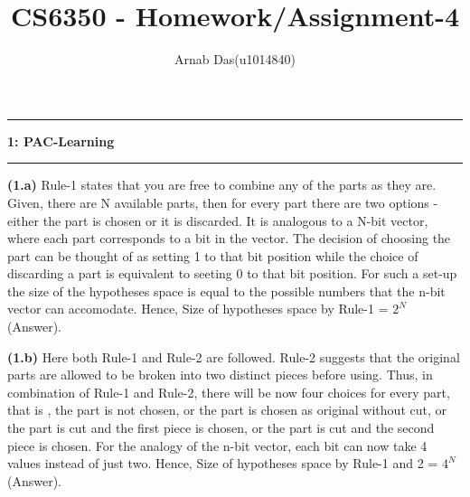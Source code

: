 \documentclass{article}
\title{CS6350 - Homework/Assignment-4}
\author{Arnab Das(u1014840)}
\newcommand\question[2]{\vspace{.25in}\hrule\textbf{#1: #2}\hrule\vspace{.10in}}
\renewcommand\part[1]{\vspace{.10in}\textbf{(#1)}}
\begin{document}
  \maketitle
  \newpage
  \newcommand\NAME{ARNAB DAS}
  \newcommand\UID{uxxxxxxx}
  \newcommand\HWNUM{4}
  
  \question{1}{PAC-Learning}
  \part{1.a} Rule-1 states that you are free to combine any of the parts as they are. Given, there are N available parts, then for every part there are two options - either the part is chosen or it is discarded. It is analogous to a N-bit vector, where each part corresponds to a bit in the vector. The decision of choosing the part can be thought of as setting 1 to that bit position while the choice of discarding a part is equivalent to seeting 0 to that bit position. For such a set-up the size of the hypotheses space is equal to the possible numbers that the n-bit vector can accomodate. Hence,\newline
  \hspace*{0.5cm} Size of hypotheses space by Rule-1 = $2^N$ (Answer). \newline
  
  \part{1.b} Here both Rule-1 and Rule-2 are followed. Rule-2 suggests that the original parts are allowed to be broken into two distinct pieces before using. Thus, in combination of Rule-1 and Rule-2, there will be now four choices for every part, that is , the part is not chosen, or the part is chosen as original without cut, or the part is cut and the first piece is chosen, or the part is cut and the second piece is chosen. For the analogy of the n-bit vector, each bit can now take 4 values instead of just two. Hence, \newline
  \hspace*{0.5cm} Size of hypotheses space by Rule-1 and 2 = $4^N$ (Answer). \newline
  
\end{document}
